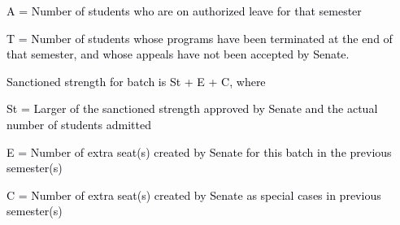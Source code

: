 \documentclass[12pt]{article}
\begin{document}
\vspace{\baselineskip}
\begin{adjustwidth}{1.0in}{0.0in}
{\fontsize{10pt}{12.0pt}\selectfont \textcolor[HTML]{00000A}{A = Number of students who are on authorized leave for that semester}\par}\par

\end{adjustwidth}


\vspace{\baselineskip}
\begin{adjustwidth}{1.0in}{0.26in}
{\fontsize{10pt}{12.0pt}\selectfont \textcolor[HTML]{00000A}{T = Number of students whose programs have been terminated at the end of that semester, and whose appeals have not been accepted by Senate.}\par}\par

\end{adjustwidth}


\vspace{\baselineskip}
\begin{adjustwidth}{0.5in}{0.0in}
{\fontsize{10pt}{12.0pt}\selectfont \textcolor[HTML]{00000A}{Sanctioned strength for batch is St + E + C, where}\par}\par

\end{adjustwidth}


\vspace{\baselineskip}
\begin{adjustwidth}{1.0in}{0.0in}
{\fontsize{9pt}{10.8pt}\selectfont \textcolor[HTML]{00000A}{St = Larger of the sanctioned strength approved by Senate and the actual number of students admitted}\par}\par

\end{adjustwidth}


\vspace{\baselineskip}
\begin{adjustwidth}{1.0in}{0.0in}
{\fontsize{10pt}{12.0pt}\selectfont \textcolor[HTML]{00000A}{E = Number of extra seat(s) created by Senate for this batch in the previous semester(s)}\par}\par

\end{adjustwidth}


\vspace{\baselineskip}
\begin{adjustwidth}{1.0in}{0.0in}
{\fontsize{10pt}{12.0pt}\selectfont \textcolor[HTML]{00000A}{C = Number of extra seat(s) created by Senate as special cases in previous semester(s)}\par}\par

\end{adjustwidth}
\end{document}
